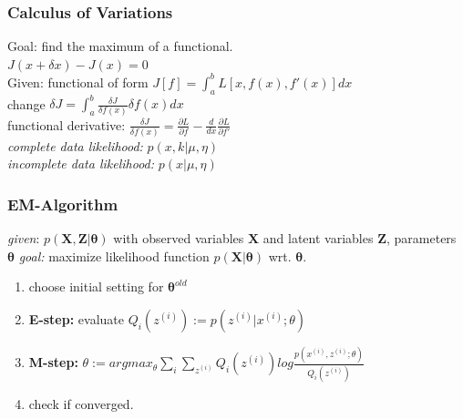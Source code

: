 \documentclass[9pt,parskip]{scrartcl}
\begin{document}
\begin{multicols*}{4}
\subsubsection*{Calculus of Variations}
Goal: find the maximum of a functional. \\
$J(x + \delta x) - J(x) = 0$ \\
Given: functional of form 
$J[f]=\int _{a}^{b} L[x,f(x),f'(x)] dx $ \\
change $\delta J = \int_a^b  \frac{\delta J}{\delta f(x)} \delta f(x) dx $ \\

functional derivative: $\frac{\delta J}{\delta f(x)} = \frac{\partial L}{\partial f} -\frac{d}{dx} \frac{\partial L}{\partial f'} $\\
\textit{complete data likelihood:} $p(x,k|\mu, \eta)$\\
\textit{incomplete data likelihood:} $p(x|\mu, \eta)$

\subsubsection*{EM-Algorithm}
\textit{given}: $p(\mathbf{X},\mathbf{Z}|\mathbf{\theta})$ with observed variables $\mathbf{X}$ and latent variables $\mathbf{Z}$, parameters $\mathbf{\theta}$
\textit{goal:} maximize likelihood function $p(\mathbf{X}|\mathbf{\theta})$ wrt. $\mathbf{\theta}$.
\begin{enumerate}
	\item choose initial setting for $\boldsymbol{\theta}^{old}$
	\item \textbf{E-step:} evaluate 
	$Q_i(z^{(i)}) := p(z^{(i)}|x^{(i)};\theta)$
	\item \textbf{M-step:} 
	$\theta := argmax_{\theta} \sum_i \sum_{z^{(i)}} Q_i(z^{(i)})log\frac{p(x^{(i)},z^{(i)};\theta)}{Q_i(z^{(i)})}$ 
	\item check if converged.
\end{enumerate}


\end{multicols*}
\end{document}
